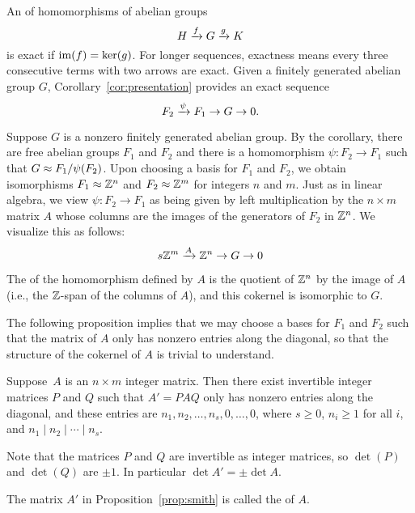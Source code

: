 An  of homomorphisms of abelian groups
$$
	H \xrightarrow{f} G \xrightarrow{g} K
$$
is exact if $\operatorname{im}(f) = \ker(g)$.
For longer sequences, exactness means every three consecutive
terms with two arrows are exact.
Given a finitely generated abelian group $G$,
Corollary~\ref{cor:presentation} provides an exact sequence
$$
	F_2 \xrightarrow{\psi} F_1 \to G \to 0.
$$

Suppose $G$ is a nonzero finitely generated abelian group.  By the
corollary, there are free abelian groups $F_1$ and $F_2$ and there is a
homomorphism $\psi:F_2 \to F_1$ such that $G\approx F_1/\psi(F_2)$.
Upon choosing a basis for $F_1$ and $F_2$, we obtain isomorphisms
$F_1\approx \mathbb{Z}^n$ and $F_2\approx \mathbb{Z}^m$ for integers $n$ and $m$.
Just as in linear algebra, we view $\psi:F_2\to F_1$ as being given
by left multiplication by the $n\times m$ matrix $A$ whose columns
are the images of the generators of $F_2$ in $\mathbb{Z}^n$.  We visualize
this as follows:
$$
	s\mathbb{Z}^m \xrightarrow{A} \mathbb{Z}^n \to G \to 0
$$

The  of the homomorphism defined by $A$ is the quotient
of $\mathbb{Z}^n$ by the image of $A$ (i.e., the $\mathbb{Z}$-span of the columns of $A$),
and this cokernel is isomorphic to $G$.

The following proposition implies that we may choose a bases for $F_1$
and $F_2$ such that the matrix of $A$ only has nonzero entries along
the diagonal, so that the structure of the cokernel of $A$ is
trivial to understand.

\begin{proposition}
	\label{prop:smith}
	Suppose~$A$ is an $n\times m$ integer matrix.  Then there exist
	invertible integer matrices $P$ and $Q$ such that $A'=PAQ$ only
	has nonzero entries along the diagonal, and these entries are
	$n_1, n_2,\ldots, n_s,0,\ldots,0$, where
	$s\geq 0$, $n_i\geq 1$ for all $i$, and $n_1\mid n_2 \mid{} \cdots \mid{} n_s$.
\end{proposition}

\begin{remark}
	Note that the matrices $P$ and $Q$ are invertible as integer
	matrices, so $\det(P)$ and $\det(Q)$ are $\pm 1$. In particular
	$\det A' = \pm\det A$.
\end{remark}

\begin{definition}
	The matrix $A'$ in Proposition~\ref{prop:smith}
	is called the  of $A$.
\end{definition}

